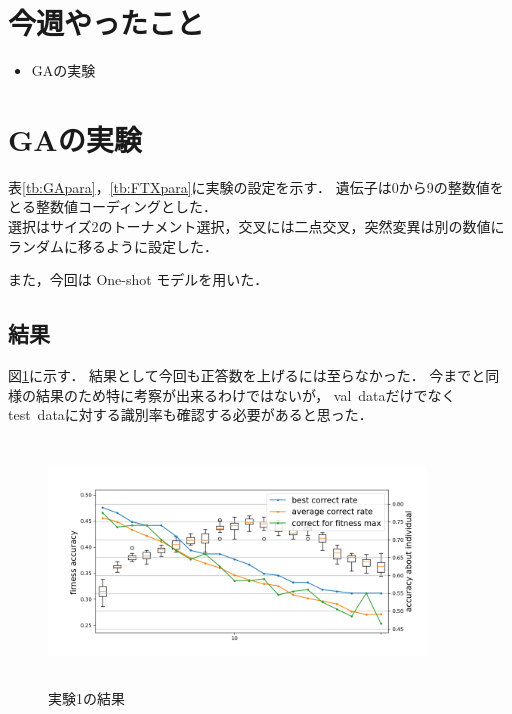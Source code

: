 \documentclass[twocolumn]{jarticle}     %
\begin{document}


\section{今週やったこと}

\begin{itemize}
	\item GAの実験
\end{itemize}

\section{GAの実験}
表\ref{tb:GApara}，\ref{tb:FTXpara}に実験の設定を示す．
遺伝子は0から9の整数値をとる整数値コーディングとした．\\
選択はサイズ2のトーナメント選択，交叉には二点交叉，突然変異は別の数値にランダムに移るように設定した．


また，今回は One-shot モデルを用いた．


\subsection{結果}
図\ref{fig:ex1}に示す．
結果として今回も正答数を上げるには至らなかった．
今までと同様の結果のため特に考察が出来るわけではないが，
val\ dataだけでなくtest\ dataに対する識別率も確認する必要があると思った．

\begin{figure}[h]
	\begin{center}
		\vspace*{-3mm}
		\hspace*{-12mm}
		\includegraphics[height=65mm,width=100mm]{graph2.png}
		\caption{実験1の結果\label{fig:ex1}}
	\end{center}
\end{figure}
\end{document}
